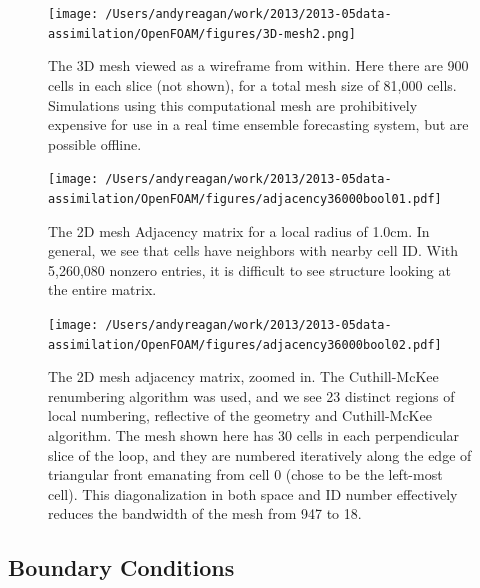 \documentclass[12pt]{report}
\begin{document}
\begin{figure}[t!]
  \centering
  \texttt{[image: /Users/andyreagan/work/2013/2013-05data-assimilation/OpenFOAM/figures/3D-mesh2.png]}
  \caption[The 3D mesh viewed as a wireframe from within]{
  The 3D mesh viewed as a wireframe from within.
  Here there are 900 cells in each slice (not shown), for a total mesh size of 81,000 cells.
  Simulations using this computational mesh are prohibitively expensive for use in a real time ensemble forecasting system, but are possible offline.
  }
  \label{fig:CFDmesh2}
\end{figure}

\begin{figure}[t!]
  \centering
  \texttt{[image: /Users/andyreagan/work/2013/2013-05data-assimilation/OpenFOAM/figures/adjacency36000bool01.pdf]}
  \caption[The 2D mesh Adjacency matrix for a local radius of 1.0cm]{
  The 2D mesh Adjacency matrix for a local radius of 1.0cm.
  In general, we see that cells have neighbors with nearby cell ID.
  With 5,260,080 nonzero entries, it is difficult to see structure looking at the entire matrix.
  }
  \label{fig:CFDmeshAdj1}
\end{figure}

\begin{figure}[h!]
  \centering
  \texttt{[image: /Users/andyreagan/work/2013/2013-05data-assimilation/OpenFOAM/figures/adjacency36000bool02.pdf]}
  \caption[The 2D mesh adjacency matrix, zoomed in]{
  The 2D mesh adjacency matrix, zoomed in.
  The Cuthill-McKee renumbering algorithm was used, and we see 23 distinct regions of local numbering, reflective of the geometry and Cuthill-McKee algorithm.
  The mesh shown here has 30 cells in each perpendicular slice of the loop, and they are numbered iteratively along the edge of triangular front emanating from cell 0 (chose to be the left-most cell).
  This diagonalization in both space and ID number effectively reduces the bandwidth of the mesh from 947 to 18.
    }
  \label{fig:CFDmeshAdj2}
\end{figure}

\subsection{Boundary Conditions}
\end{document}
